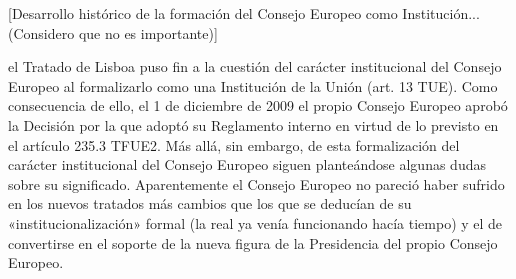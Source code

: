 \documentclass[10pt,a4paper]{article}
\begin{document}
[Desarrollo histórico de la formación del Consejo Europeo como Institución... (Considero que no es importante)]

el Tratado de Lisboa puso fin a la cuestión del carácter institucional del Consejo Europeo al formalizarlo como una Institución de la Unión (art. 13 TUE). Como consecuencia de ello, el 1 de diciembre de 2009 el propio Consejo Europeo aprobó la Decisión por la que adoptó su Reglamento interno en virtud de lo previsto en el artículo 235.3 TFUE2. Más allá, sin embargo, de esta formalización del carácter institucional del Consejo Europeo siguen planteándose algunas dudas sobre su significado. Aparentemente el Consejo Europeo no pareció haber sufrido en los nuevos tratados más cambios que los que se deducían de su «institucionalización» formal (la real ya venía funcionando hacía tiempo) y el de convertirse en el soporte de la nueva figura de la Presidencia del propio Consejo Europeo.
\end{document}
